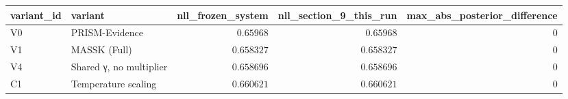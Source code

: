 \begin{tabular}{llrrr}
\toprule
variant\_id & variant & nll\_frozen\_system & nll\_section\_9\_this\_run & max\_abs\_posterior\_difference \\
\midrule
V0 & PRISM-Evidence & $0.65968$ & $0.65968$ & $0$ \\
V1 & MASSK (Full) & $0.658327$ & $0.658327$ & $0$ \\
V4 & Shared γ, no multiplier & $0.658696$ & $0.658696$ & $0$ \\
C1 & Temperature scaling & $0.660621$ & $0.660621$ & $0$ \\
\bottomrule
\end{tabular}
